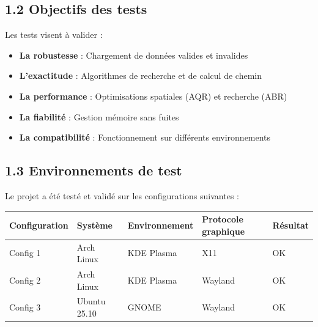 \documentclass[
]{article}
\newcommand{\OK}{OK~\twemoji{white_check_mark}}
\newcommand{\OK}{OK~\twemoji{white_check_mark}}
\providecommand{\tightlist}{%
  \setlength{\itemsep}{0pt}\setlength{\parskip}{0pt}}
\begin{document}
\subsection{1.2 Objectifs des tests}\label{objectifs-des-tests}

Les tests visent à valider :

\begin{itemize}
\tightlist
\item
  \textbf{La robustesse} : Chargement de données valides et invalides
\item
  \textbf{L'exactitude} : Algorithmes de recherche et de calcul de
  chemin
\item
  \textbf{La performance} : Optimisations spatiales (AQR) et recherche
  (ABR)
\item
  \textbf{La fiabilité} : Gestion mémoire sans fuites
\item
  \textbf{La compatibilité} : Fonctionnement sur différents
  environnements
\end{itemize}

\subsection{1.3 Environnements de test}\label{environnements-de-test}

Le projet a été testé et validé sur les configurations suivantes :

\begin{longtable}[]{@{}
  >{\raggedright\arraybackslash}p{}
  >{\raggedright\arraybackslash}p{}
  >{\raggedright\arraybackslash}p{}
  >{\raggedright\arraybackslash}p{}
  >{\raggedright\arraybackslash}p{}@{}}
\toprule\noalign{}
\begin{minipage}[b]{\linewidth}\raggedright
Configuration
\end{minipage} & \begin{minipage}[b]{\linewidth}\raggedright
Système
\end{minipage} & \begin{minipage}[b]{\linewidth}\raggedright
Environnement
\end{minipage} & \begin{minipage}[b]{\linewidth}\raggedright
Protocole graphique
\end{minipage} & \begin{minipage}[b]{\linewidth}\raggedright
Résultat
\end{minipage} \\
\midrule\noalign{}
\endhead
\bottomrule\noalign{}
\endlastfoot
Config 1 & Arch Linux & KDE Plasma & X11 & \OK \\
Config 2 & Arch Linux & KDE Plasma & Wayland & \OK \\
Config 3 & Ubuntu 25.10 & GNOME & Wayland & \OK \\
\end{longtable}
\end{document}
